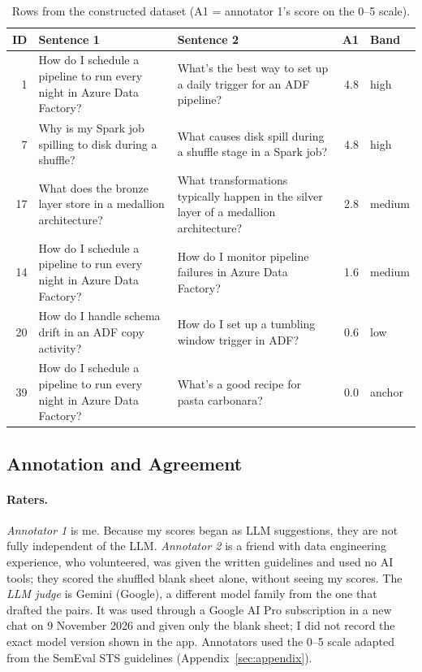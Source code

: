 \documentclass[11pt]{article}
\begin{document}
\begin{table}[t]
\centering\small
\begin{tabular}{rp{5.6cm}p{5.6cm}rl}
\toprule
ID & Sentence 1 & Sentence 2 & A1 & Band \\
\midrule
1 & How do I schedule a pipeline to run every night in Azure Data Factory? & What's the best way to set up a daily trigger for an ADF pipeline? & 4.8 & high \\
7 & Why is my Spark job spilling to disk during a shuffle? & What causes disk spill during a shuffle stage in a Spark job? & 4.8 & high \\
17 & What does the bronze layer store in a medallion architecture? & What transformations typically happen in the silver layer of a medallion architecture? & 2.8 & medium \\
14 & How do I schedule a pipeline to run every night in Azure Data Factory? & How do I monitor pipeline failures in Azure Data Factory? & 1.6 & medium \\
20 & How do I handle schema drift in an ADF copy activity? & How do I set up a tumbling window trigger in ADF? & 0.6 & low \\
39 & How do I schedule a pipeline to run every night in Azure Data Factory? & What's a good recipe for pasta carbonara? & 0.0 & anchor \\
\bottomrule
\end{tabular}
\caption{Rows from the constructed dataset (A1 = annotator 1's score on the 0--5 scale).}
\label{tab:snippet}
\end{table}

\subsection{Annotation and Agreement}
\paragraph{Raters.}
\emph{Annotator 1} is me. Because my scores began as LLM suggestions, they are not fully independent of the LLM. \emph{Annotator 2} is 
a friend with data engineering experience, who volunteered, was given the written guidelines and used no AI tools; they scored the shuffled blank sheet alone, without seeing my scores. The \emph{LLM judge} is Gemini (Google), a different model family from the one that drafted the pairs. It was used through a Google AI Pro subscription in a new chat on 9 November 2026 and given only the blank sheet; I did not record the exact model version shown in the app. Annotators used the 0--5 scale adapted from the SemEval STS guidelines (Appendix~\ref{sec:appendix}).
\end{document}
